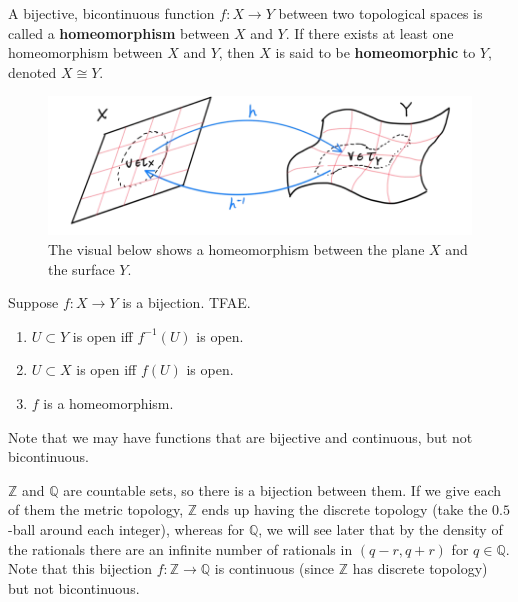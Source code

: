   \begin{definition}[Homeomorphism]
    A bijective, bicontinuous function $f: X \longrightarrow Y$ between two topological spaces is called a \textbf{homeomorphism} between $X$ and $Y$. If there exists at least one homeomorphism between $X$ and $Y$, then $X$ is said to be \textbf{homeomorphic} to $Y$, denoted $X \cong Y$. 

    \begin{figure}[H]
      \centering 
      \includegraphics[scale=0.4]{img/Homeomorphism_of_Plane.png}
      \caption{The visual below shows a homeomorphism between the plane $X$ and the surface $Y$.}
      \label{fig:homeomorphism_plane}
    \end{figure}
  \end{definition}

  \begin{theorem}
    Suppose $f: X \rightarrow Y$ is a bijection. TFAE. 
    \begin{enumerate}
      \item $U \subset Y$ is open iff $f^{-1} (U)$ is open. 
      \item $U \subset X$ is open iff $f(U)$ is open. 
      \item $f$ is a homeomorphism. 
    \end{enumerate}
  \end{theorem} 

  Note that we may have functions that are bijective and continuous, but not bicontinuous. 

  \begin{example}
    $\mathbb{Z}$ and $\mathbb{Q}$ are countable sets, so there is a bijection between them. If we give each of them the metric topology, $\mathbb{Z}$ ends up having the discrete topology (take the $0.5$-ball around each integer), whereas for $\mathbb{Q}$, we will see later that by the density of the rationals there are an infinite number of rationals in $(q - r, q + r)$ for $q \in \mathbb{Q}$. Note that this bijection $f: \mathbb{Z} \rightarrow \mathbb{Q}$ is continuous (since $\mathbb{Z}$ has discrete topology) but not bicontinuous. 
  \end{example}


